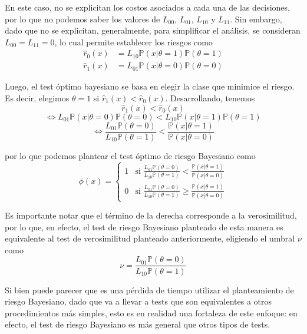 \documentclass[
  11pt,
  letterpaper,
   addpoints,
   answers
  ]{exam}
\begin{document}
\begin{questions}
\begin{solution}
En este caso, no se explicitan los costos asociados a cada una de las decisiones, por lo que no podemos saber los valores de \( L_{00} \), \( L_{01} \), \( L_{10} \) y \( L_{11} \). Sin embargo, dado que no se explicitan, generalmente, para simplificar el análisis, se consideran \( L_{00} = L_{11} = 0 \), lo cual permite establecer los riesgos como
\begin{align}
\hat{r}_0(x) &= L_{10} \mathbb{P}(x | \theta = 1) \mathbb{P}(\theta = 1) \\
\hat{r}_1(x) &= L_{01} \mathbb{P}(x | \theta = 0) \mathbb{P}(\theta = 0)
\end{align}

Luego, el test óptimo bayesiano se basa en elegir la clase que minimice el riesgo. Es decir, elegimos \(\theta = 1\) si \(\hat{r}_1(x) < \hat{r}_0(x)\). Desarrollando, tenemos
\[
\hat{r}_1(x) < \hat{r}_0(x)
\]
\[
\iff L_{01} \mathbb{P}(x | \theta = 0) \mathbb{P}(\theta = 0) < L_{10} \mathbb{P}(x | \theta = 1) \mathbb{P}(\theta = 1)
\]
\[
\iff \frac{L_{01} \mathbb{P}(\theta = 0)}{L_{10} \mathbb{P}(\theta = 1)} < \frac{\mathbb{P}(x | \theta = 1)}{\mathbb{P}(x | \theta = 0)}
\]

por lo que podemos plantear el test óptimo de riesgo Bayesiano como
\[
\phi(x) = \begin{cases}
1 & \text{si } \frac{L_{01} \mathbb{P}(\theta = 0)}{L_{10} \mathbb{P}(\theta = 1)} < \frac{\mathbb{P}(x | \theta = 1)}{\mathbb{P}(x | \theta = 0)} \\
0 & \text{si } \frac{L_{01} \mathbb{P}(\theta = 0)}{L_{10} \mathbb{P}(\theta = 1)} \geq \frac{\mathbb{P}(x | \theta = 1)}{\mathbb{P}(x | \theta = 0)}
\end{cases}
\]

Es importante notar que el término de la derecha corresponde a la verosimilitud, por lo que, en efecto, el test de riesgo Bayesiano planteado de esta manera es equivalente al test de verosimilitud planteado anteriormente, eligiendo el umbral \(\nu\) como
\[
\nu = \frac{L_{01} \mathbb{P}(\theta = 0)}{L_{10} \mathbb{P}(\theta = 1)}
\]

Si bien puede parecer que es una pérdida de tiempo utilizar el planteamiento de riesgo Bayesiano, dado que va a llevar a tests que son equivalentes a otros procedimientos más simples, esto es en realidad una fortaleza de este enfoque: en efecto, el test de riesgo Bayesiano es más general que otros tipos de tests.


\end{solution}
\end{questions}
\end{document}
